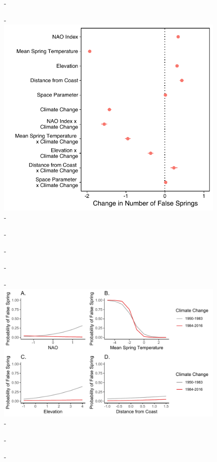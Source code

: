 \documentclass{article}\usepackage[]{graphicx}\usepackage[]{color}
\begin{document}
  
{\begin{figure} [H]
  -\begin{center}
  -\includegraphics[width=16cm]{..//figures/model_output_dvr.pdf}
  -\caption{}\label{fig:maineffects}
  -\end{center}
  -\end{figure}}
  

{\begin{figure} [H]
  -\begin{center}
  -\includegraphics[width=16cm]{..//figures/InteractionPlots/IntrxnPlots_dvr.pdf}
  -\caption{}\label{fig:intrxns}
  -\end{center}
  -\end{figure}}
  
\end{document}
